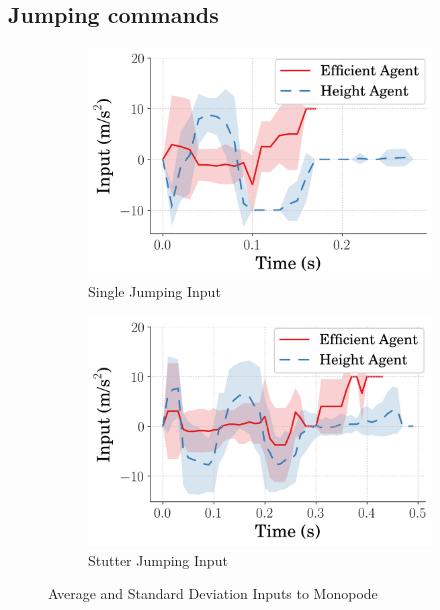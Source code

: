 \subsection{Jumping commands}
\label{subsection:avg_input_performance}
% 
\begin{figure}[tb!]
  \centering
  \begin{subfigure}{.49\textwidth}
    \centering
    \includegraphics[width=\linewidth]{Figures/Ch2/avg_One_Input_.png}
    \caption{Single Jumping Input}
    \label{fig:avg_one_input}
  \end{subfigure}%
  \hfill
  \begin{subfigure}{.49\textwidth}
    \centering
    \includegraphics[width=\linewidth]{Figures/Ch2/avg_Stutter_Input_.png}
     \caption{Stutter Jumping Input}
     \label{fig:avg_stutter_input}
  \end{subfigure}
   \caption{Average and Standard Deviation Inputs to Monopode}
   \label{fig:avg_input}
\end{figure}
% 

